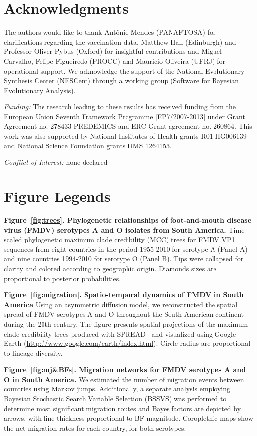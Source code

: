 \documentclass[10pt]{article}
\begin{document}
\section*{Acknowledgments}
The authors would like to thank Ant\^onio Mendes (PANAFTOSA) for clarifications regarding the vaccination data, Matthew Hall (Edinburgh) and Professor Oliver Pybus (Oxford) for insightful contributions and Miguel Carvalho, Felipe Figueiredo (PROCC) and Mauricio Oliveira (UFRJ) for operational support.
We acknowledge the support of the National Evolutionary Synthesis Center (NESCent) through a working group (Software for Bayesian Evolutionary Analysis).

\emph{Funding:} The research leading to these results has received funding from the European Union Seventh Framework Programme [FP7/2007-2013] under Grant Agreement no. 278433-PREDEMICS and ERC Grant agreement no. 260864.
This work was also supported by National Institutes of Health grants R01 HG006139 and National Science Foundation grants DMS 1264153.

\emph{Conflict of Interest:} none declared

\newpage

\newpage
\section*{Figure Legends}
{\bf Figure~\ref{fig:trees}. Phylogenetic relationships of foot-and-mouth disease virus (FMDV) serotypes A and O isolates from South America.} Time-scaled phylogenetic maximum clade credibility (MCC) trees for FMDV VP1 sequences from eight countries in the period 1955-2010 for serotype A (Panel A) and nine countries 1994-2010 for serotype O (Panel B).
Tips were collapsed for clarity and colored according to geographic origin.
Diamonds sizes are proportional to posterior probabilities.

{\bf Figure~\ref{fig:migration}. Spatio-temporal dynamics of FMDV in South America} Using an asymmetric diffusion model, we reconstructed the spatial spread of FMDV serotypes A and O throughout the South American continent during the 20th century.
The figure presents spatial projections of the maximum clade credibility trees produced with SPREAD~\cite{spread} and visualized using Google Earth (\url{http://www.google.com/earth/index.html}).
Circle radius are proportional to lineage diversity.

{\bf Figure~\ref{fig:mj&BFs}. Migration networks for FMDV serotypes A and O in South America.} We estimated the number of migration events between countries using Markov jumps.
Additionally, a separate analysis employing Bayesian Stochastic Search Variable Selection (BSSVS) was performed to determine most significant migration routes and Bayes factors are depicted by arrows, with line thickness proportional to BF magnitude.
Coroplethic maps show the net migration rates for each country, for both serotypes.
\end{document}
